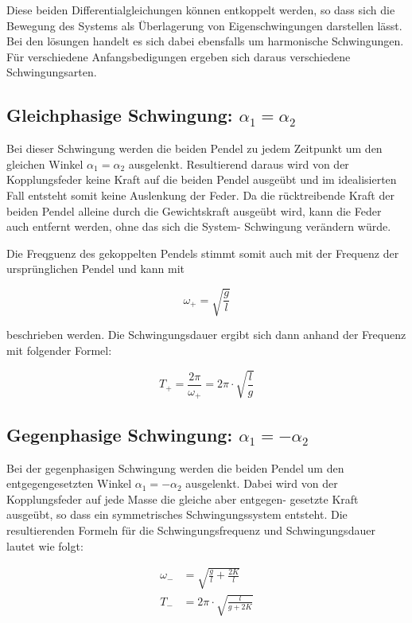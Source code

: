 Diese beiden Differentialgleichungen können entkoppelt werden, so dass sich die Bewegung des Systems
als Überlagerung von Eigenschwingungen darstellen lässt. Bei den lösungen handelt es sich dabei
ebensfalls um harmonische Schwingungen. Für verschiedene Anfangsbedigungen ergeben
sich daraus verschiedene Schwingungsarten.

\subsection{Gleichphasige Schwingung: \texorpdfstring{$\alpha_1 = \alpha_2$}{}}

Bei dieser Schwingung werden die beiden Pendel zu jedem Zeitpunkt um den gleichen Winkel
$\alpha_1 = \alpha_2$ ausgelenkt. Resultierend daraus
wird von der Kopplungsfeder keine Kraft auf die beiden Pendel ausgeübt und im idealisierten Fall
entsteht somit keine Auslenkung der Feder. Da die rücktreibende Kraft der beiden Pendel alleine
durch die Gewichtskraft ausgeübt wird, kann die Feder auch entfernt werden, ohne das sich die System-
Schwingung verändern würde.

Die Freqguenz des gekoppelten Pendels stimmt somit auch mit der Frequenz der ursprünglichen Pendel
und kann mit

\begin{equation}
  \omega_+ = \sqrt{\frac{g}{l}}
\end{equation}

beschrieben werden. Die Schwingungsdauer ergibt sich dann anhand der Frequenz mit folgender Formel:

\begin{equation}
  T_+ = \frac{2\pi}{\omega_+} = 2\pi \cdot \sqrt{\frac{l}{g}}
\end{equation}

\subsection{Gegenphasige Schwingung: \texorpdfstring{$\alpha_1 = -\alpha_2$}{}}

Bei der gegenphasigen Schwingung werden die beiden Pendel um den entgegengesetzten Winkel $\alpha_1 = -\alpha_2$
ausgelenkt. Dabei wird von der Kopplungsfeder auf jede Masse die gleiche aber entgegen-
gesetzte Kraft ausgeübt, so dass ein symmetrisches Schwingungssystem entsteht. Die resultierenden
Formeln für die Schwingungsfrequenz und Schwingungsdauer lautet wie folgt:

\begin{align}
  \omega_-  &= \sqrt{\frac{g}{l} + \frac{2 K}{l}} \\
  T_-       &= 2\pi \cdot \sqrt{\frac{l}{g + 2K}}
\end{align}

